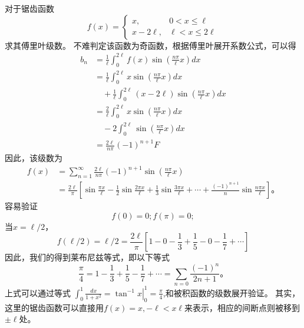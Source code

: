 \begin{examplebox}{
对于锯齿函数
\[  
f(x)= \begin{cases}
  x,   &  0 < x \leq  \ell 
  \\
  x - 2 \ell,   & \ell < x \leq 2\ell
\end{cases}
\]
求其傅里叶级数。
}
不难判定该函数为奇函数，根据傅里叶展开系数公式，可以得
\begin{align}
b_n &=   \frac{1}{\ell} \int_{0}^{2\ell} f(x) \sin {  \left( \frac{n\pi}{\ell} x \right) } dx \nonumber
\\
&= \frac{1}{\ell} \int_{0}^{2\ell} x  \sin {  \left( \frac{n\pi}{\ell} x \right) } dx \nonumber
  \\ & \quad +
 \frac{1}{\ell} \int_{0}^{2\ell} (x - 2\ell) \sin {  \left( \frac{n\pi}{\ell} x \right) } dx \nonumber
 \\ 
 &= \frac{2}{\ell} \int_{0}^{2\ell} x \sin {  \left( \frac{n\pi}{\ell} x \right) } dx \nonumber
 \\ & \quad 
 -2 \int_{0}^{2\ell}   \sin {  \left( \frac{n\pi}{\ell} x \right) } dx \nonumber
 \\
 & = \frac{2\ell}{n\pi} (-1)^{n+1}  F
\end{align}
因此，该级数为
\begin{align}
f(x) &=  \sum_{n=1}^{\infty} \frac{2 \ell }{n\pi} (-1)^{n+1} \sin {  \left( \frac{n\pi}{\ell} x \right) }  \nonumber
\\
 & =\frac{2\ell}{\pi} \left[ \sin{\frac{\pi x}{\ell} } - \frac{1}{2}\sin{\frac{2\pi x}{\ell} } 
  +  \frac{1}{3}\sin{\frac{3\pi x}{\ell} } + \cdots + \frac{(-1)^{n+1}}{n}\sin{\frac{n\pi x}{\ell} }
 \right] \nonumber
\textrm{。}
\end{align}
容易验证
\[
  f(0) = 0; f(\pi) = 0;
\]
当$x=\ell/2$， 
\[
f(\ell/2) = \ell/2 =   \frac{2\ell}{\pi} \left[ 1 - 0 - \frac{1}{3} + \frac{1}{5} - 0 -\frac{1}{7}+ \cdots \right]
\]
因此，我们的得到莱布尼兹等式，即以下等式
\[
\frac{\pi}{4} = 1-\frac{1}{3} + \frac{1}{5} - \frac{1}{7} + \cdots = \sum_{n=0} \frac{(-1)^n}{2n + 1} \textrm{。}
\]
上式可以通过等式
$\int_0^1 \frac{d x}{1+x^2}=\left.\tan ^{-1} x\right|_0 ^1=\frac{\pi}{4}$,和被积函数的级数展开验证。
其实，这里的锯齿函数可以直接用$f(x) = x, -\ell < x \ell$来表示，相应的间断点则被移到$\pm \ell$处。
\end{examplebox}


